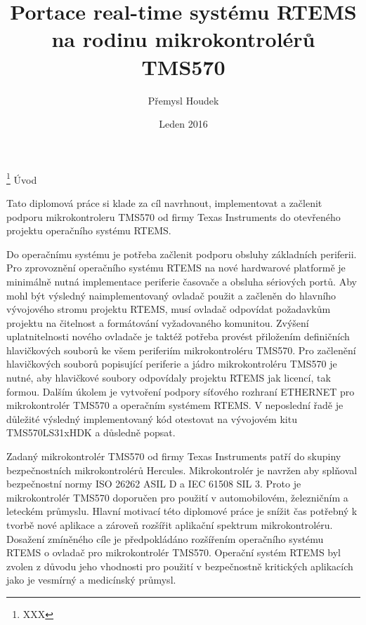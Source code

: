 

\worktype [M/CZ]
\title {Portace real-time systému RTEMS na rodinu mikrokontrolérů TMS570}
\author {Přemysl Houdek}
\date {Leden 2016}
\thanks {XXX}
{}
\makefront
\chap Úvod

Tato diplomová práce si klade za cíl navrhnout, implementovat a začlenit podporu mikrokontroleru TMS570 od firmy Texas Instruments do otevřeného projektu operačního systému RTEMS.

Do operačnímu systému je potřeba začlenit podporu obsluhy základních periferii.
Pro zprovoznění operačního systému RTEMS na nové hardwarové platformě je minimálně nutná implementace periferie časovače a obsluha sériových portů.
Aby mohl být výsledný naimplementovaný ovladač použit a začleněn do hlavního vývojového stromu projektu RTEMS, musí ovladač odpovídat požadavkům projektu na čitelnost a formátování vyžadovaného komunitou.
Zvýšení uplatnitelnosti nového ovladače je taktéž potřeba provést přiložením definičních hlavičkových souborů ke všem periferiím mikrokontroléru TMS570.
Pro začlenění hlavičkových souborů popisující periferie a jádro mikrokontroléru TMS570 je nutné, aby hlavičkové soubory odpovídaly projektu RTEMS jak licencí, tak formou.
Dalším úkolem je vytvoření podpory síťového rozhraní ETHERNET pro mikrokontrolér TMS570 a operačním systémem RTEMS.
V neposlední řadě je důležité výsledný implementovaný kód otestovat na vývojovém kitu TMS570LS31xHDK a důsledně popsat.

\medskip

Zadaný mikrokontrolér TMS570 od firmy Texas Instruments patří do skupiny bezpečnostních mikrokontrolérů Hercules.
Mikrokontrolér je navržen aby splňoval bezpečnostní normy ISO 26262 ASIL D a IEC 61508 SIL 3.
Proto je mikrokontrolér TMS570 doporučen pro použití v automobilovém, železničním a leteckém průmyslu.
Hlavní motivací této diplomové práce je snížit čas potřebný k tvorbě nové aplikace a zároveň rozšířit aplikační spektrum mikrokontroléru.
Dosažení zmíněného cíle je předpokládáno rozšířením operačního systému RTEMS o ovladač pro mikrokontrolér TMS570.
Operační systém RTEMS byl zvolen z důvodu jeho vhodnosti pro použití v bezpečnostně kritických aplikacích jako je vesmírný a medicínský průmysl.

